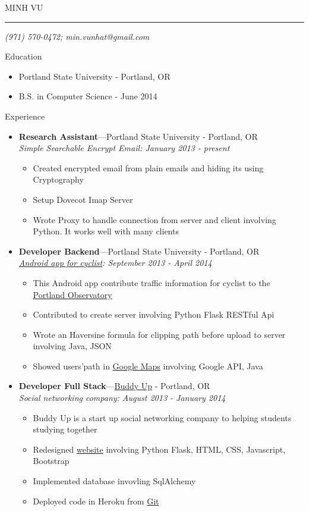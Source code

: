 \documentclass[10pt,oneside]{article}
\makeatletter
\newcommand{\name}{MINH VU}
\newcommand{\phone}{(971) 570-0472}
\newcommand{\email}{min.vunhat@gmail.com}
\newcommand{\bigname}[1]{
    \begin{center}\fontfamily{phv}\selectfont\Huge\scshape#1\end{center}
}
\newenvironment{ressection}[1]{
    \vspace{4pt}
    {\fontfamily{phv}\selectfont\Large#1}
    \begin{itemize}
    \vspace{3pt}
}{
    \end{itemize}
}
\newcommand{\ressubitem}[1]{
    \vspace{-1pt}
    \item \begin{flushleft} #1 \end{flushleft}
}
\newcommand{\resbigitem}[3]{
    \vspace{-5pt}
    \item
    \textbf{#1}---#2 \\
    \textit{#3}
}
\newenvironment{ressubsec}[3]{
    \resbigitem{#1}{#2}{#3}
    \vspace{-2pt}
    \begin{itemize}
}{
    \end{itemize}
}
\makeatother
\begin{document}
 \selectfont
\bigname{\name}
\vspace{-8pt} \rule{\textwidth}{1pt}
\vspace{-1pt} {\small\itshape \hfill \phone; \email}
\vspace{8 pt}


\begin{ressection}{Education}
    \ressubitem{Portland State University - Portland, OR}
    \ressubitem{B.S. in Computer Science - June 2014}
\end{ressection}


\begin{ressection}{Experience}
    \begin{ressubsec}{\textbf{Research Assistant}}{Portland State University - Portland, OR}{Simple Searchable Encrypt Email: January 2013 - present}
        \ressubitem{Created encrypted email from plain emails and hiding its using Cryptography}
        \ressubitem{Setup Dovecot Imap Server}
        \ressubitem{Wrote Proxy to handle connection from server and client involving Python. It works well with many clients}
    \end{ressubsec}
    \begin{ressubsec}{\textbf{Developer Backend}}{Portland State University - Portland, OR}{\href{https://github.com/PedalPDX}{Android app for cyclist}: September 2013 - April 2014}
        \ressubitem{This Android app contribute traffic information for cyclist to the \href{http://portal.its.pdx.edu/Portal/index.php/home/}{Portland Observatory}}
        \ressubitem{Contributed to create server involving Python Flask RESTful Api}
        \ressubitem{Wrote an Haversine formula for clipping path before upload to server involving Java, JSON}
        \ressubitem{Showed users'path in \href{youtube.com/watch?v=4yytWb-Zf6o}{Google Maps} involving Google API, Java}
    \end{ressubsec}
    \begin{ressubsec}{\textbf{Developer Full Stack}}{\href{http://www.buddyup.org/}{Buddy Up} - Portland, OR}{Social networking company: August 2013 - January 2014}
        \ressubitem{Buddy Up is a start up social networking company to helping students studying together}
        \ressubitem{Redesigned \href{http://buddyup.herokuapp.com/home}{website} involving Python Flask, HTML, CSS, Javascript, Bootstrap}
        \ressubitem{Implemented database invovling SqlAlchemy}
        \ressubitem{Deployed code in Heroku from \href{https://github.com/vunhatminh241191}{Git}}

\end{ressubsec}
\end{ressection}
\end{document}
